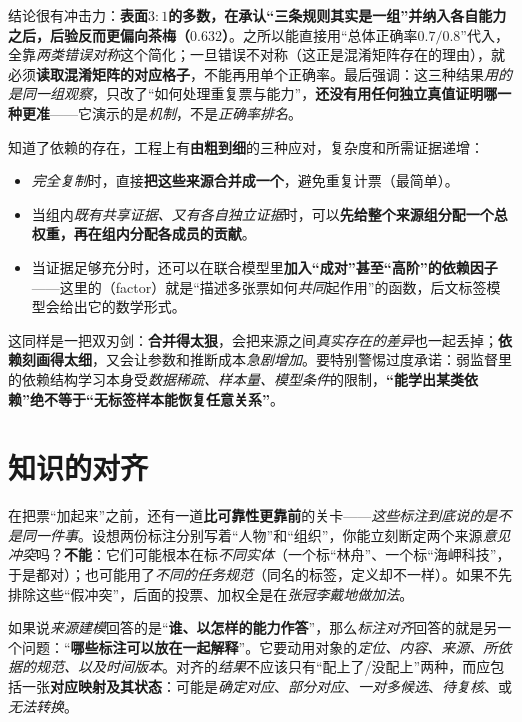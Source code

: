 结论很有冲击力：\textbf{表面$3:1$的多数，在承认“三条规则其实是一组”并纳入各自能力之后，后验反而更偏向茶梅（$0.632$）}。之所以能直接用“总体正确率$0.7/0.8$”代入，全靠\emph{两类错误对称}这个简化；一旦错误不对称（这正是混淆矩阵存在的理由），就必须\textbf{读取混淆矩阵的对应格子}，不能再用单个正确率。最后强调：这三种结果\emph{用的是同一组观察}，只改了“如何处理重复票与能力”，\textbf{还没有用任何独立真值证明哪一种更准}——它演示的是\emph{机制}，不是\emph{正确率排名}。

知道了依赖的存在，工程上有\textbf{由粗到细}的三种应对，复杂度和所需证据递增：
\begin{itemize}\item \emph{完全复制}时，直接\textbf{把这些来源合并成一个}，避免重复计票（最简单）。\item 当组内\emph{既有共享证据、又有各自独立证据}时，可以\textbf{先给整个来源组分配一个总权重，再在组内分配各成员的贡献}。\item 当证据足够充分时，还可以在联合模型里\textbf{加入“成对”甚至“高阶”的依赖因子}——这里的（factor）就是“描述多张票如何\emph{共同}起作用”的函数，后文标签模型会给出它的数学形式。\end{itemize}
这同样是一把双刃剑：\textbf{合并得太狠}，会把来源之间\emph{真实存在的差异}也一起丢掉；\textbf{依赖刻画得太细}，又会让参数和推断成本\emph{急剧增加}。要特别警惕过度承诺：弱监督里的依赖结构学习本身受\emph{数据稀疏、样本量、模型条件}的限制，\textbf{“能学出某类依赖”绝不等于“无标签样本能恢复任意关系”}。

\section{知识的对齐}
\label{sec:knowledge-fusion-alignment}

在把票“加起来”之前，还有一道\textbf{比可靠性更靠前}的关卡——\emph{这些标注到底说的是不是同一件事}。设想两份标注分别写着“人物”和“组织”，你能立刻断定两个来源\emph{意见冲突}吗？\textbf{不能}：它们可能根本在标\emph{不同实体}（一个标“林舟”、一个标“海岬科技”，于是都对）；也可能用了\emph{不同的任务规范}（同名的标签，定义却不一样）。如果不先排除这些“假冲突”，后面的投票、加权全是在\emph{张冠李戴地做加法}。

如果说\emph{来源建模}回答的是“\textbf{谁、以怎样的能力作答}”，那么\emph{标注对齐}回答的就是另一个问题：“\textbf{哪些标注可以放在一起解释}”。它要动用对象的\emph{定位、内容、来源、所依据的规范、以及时间版本}。对齐的\emph{结果}不应该只有“配上了/没配上”两种，而应包括一张\textbf{对应映射及其状态}：可能是\emph{确定对应}、\emph{部分对应}、\emph{一对多候选}、\emph{待复核}、或\emph{无法转换}。

